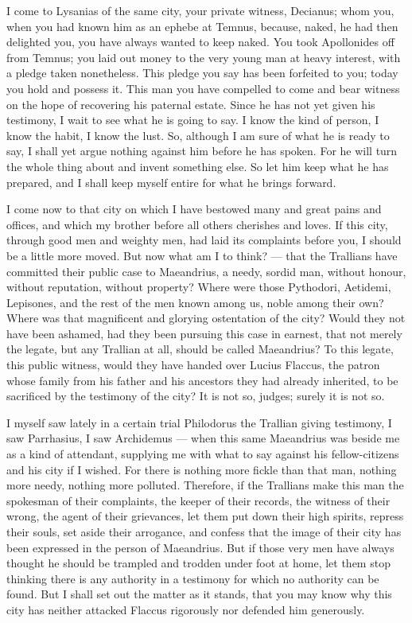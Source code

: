  I come to Lysanias of the same city, your private witness, Decianus; whom you, when you had known him as an ephebe at Temnus, because, naked, he had then delighted you, you have always wanted to keep naked. You took Apollonides off from Temnus; you laid out money to the very young man at heavy interest, with a pledge taken nonetheless. This pledge you say has been forfeited to you; today you hold and possess it. This man you have compelled to come and bear witness on the hope of recovering his paternal estate. Since he has not yet given his testimony, I wait to see what he is going to say. I know the kind of person, I know the habit, I know the lust. So, although I am sure of what he is ready to say, I shall yet argue nothing against him before he has spoken. For he will turn the whole thing about and invent something else. So let him keep what he has prepared, and I shall keep myself entire for what he brings forward.

 I come now to that city on which I have bestowed many and great pains and offices, and which my brother before all others cherishes and loves. If this city, through good men and weighty men, had laid its complaints before you, I should be a little more moved. But now what am I to think? --- that the Trallians have committed their public case to Maeandrius, a needy, sordid man, without honour, without reputation, without property? Where were those Pythodori, Aetidemi, Lepisones, and the rest of the men known among us, noble among their own? Where was that magnificent and glorying ostentation of the city? Would they not have been ashamed, had they been pursuing this case in earnest, that not merely the legate, but any Trallian at all, should be called Maeandrius? To this legate, this public witness, would they have handed over Lucius Flaccus, the patron whose family from his father and his ancestors they had already inherited, to be sacrificed by the testimony of the city? It is not so, judges; surely it is not so.

 I myself saw lately in a certain trial Philodorus the Trallian giving testimony, I saw Parrhasius, I saw Archidemus --- when this same Maeandrius was beside me as a kind of attendant, supplying me with what to say against his fellow-citizens and his city if I wished. For there is nothing more fickle than that man, nothing more needy, nothing more polluted. Therefore, if the Trallians make this man the spokesman of their complaints, the keeper of their records, the witness of their wrong, the agent of their grievances, let them put down their high spirits, repress their souls, set aside their arrogance, and confess that the image of their city has been expressed in the person of Maeandrius. But if those very men have always thought he should be trampled and trodden under foot at home, let them stop thinking there is any authority in a testimony for which no authority can be found. But I shall set out the matter as it stands, that you may know why this city has neither attacked Flaccus rigorously nor defended him generously.

